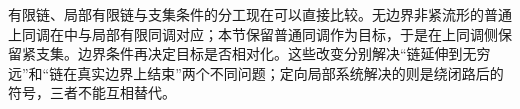 有限链、局部有限链与支集条件的分工现在可以直接比较。无边界非紧流形的普通上同调在中与局部有限同调对应；本节保留普通同调作为目标，于是在上同调侧保留紧支集。边界条件再决定目标是否相对化。这些改变分别解决“链延伸到无穷远”和“链在真实边界上结束”两个不同问题；定向局部系统解决的则是绕闭路后的符号，三者不能互相替代。
